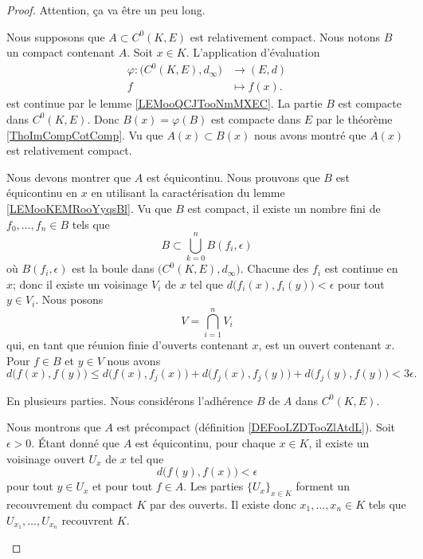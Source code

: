 \begin{proof}
	Attention, ça va être un peu long.
	\begin{subproof}
		\spitem[\( \Rightarrow\)]
		Nous supposons que \( A\subset C^0(K,E)\) est relativement compact. Nous notons \( B\) un compact contenant \( A\). Soit \( x\in K\). L'application d'évaluation
		\begin{equation}
			\begin{aligned}
				\varphi\colon \big(C^0(K,E),d_{\infty}\big) & \to (E,d)     \\
				f                                           & \mapsto f(x).
			\end{aligned}
		\end{equation}
		est continue par le lemme \ref{LEMooQCJTooNmMXEC}. La partie \( B\) est compacte dans \( C^0(K,E)\). Donc \( B(x)=\varphi(B)\) est compacte dans \( E\) par le théorème \ref{ThoImCompCotComp}. Vu que \( A(x)\subset B(x)\) nous avons montré que \( A(x)\) est relativement compact.

		Nous devons montrer que \( A\) est équicontinu. Nous prouvons que \( B\) est équicontinu en \( x\) en utilisant la caractérisation du lemme \ref{LEMooKEMRooYyqsBl}. Vu que \( B\) est compact, il existe un nombre fini de \( f_0,\ldots,f_n\in B\) tels que
		\begin{equation}
			B\subset \bigcup_{k=0}^nB(f_i,\epsilon)
		\end{equation}
		où \( B(f_i,\epsilon)\) est la boule dans \( \big( C^0(K,E),d_{\infty} \big)\). Chacune des \( f_i\) est continue en \( x\); donc il existe un voisinage \( V_i\) de \( x\) tel que \( d\big( f_i(x),f_i(y) \big)<\epsilon\) pour tout \( y\in V_i\). Nous posons
		\begin{equation}
			V=\bigcap_{i=1}^nV_i
		\end{equation}
		qui, en tant que réunion finie d'ouverts contenant \( x\), est un ouvert contenant \( x\). Pour \( f\in B\) et \( y\in V\) nous avons
		\begin{equation}
			d\big( f(x),f(y) \big)\leq d\big( f(x),f_j(x) \big)+d\big( f_j(x),f_j(y) \big)+d\big( f_j(y),f(y) \big)<3\epsilon.
		\end{equation}

		\spitem[\( \Leftarrow\)]
		En plusieurs parties. Nous considérons l'adhérence \( B\) de \( A\) dans \( C^0(K,E)\).
		\begin{subproof}
			Nous montrons que \( A\) est précompact (définition \ref{DEFooLZDTooZlAtdL}). Soit \( \epsilon>0\). Étant donné que \( A\) est équicontinu, pour chaque \( x\in K\), il existe un voisinage ouvert \( U_x\) de \( x\) tel que
			\begin{equation}
				d\big( f(y),f(x) \big)<\epsilon
			\end{equation}
			pour tout \( y\in U_x\) et pour tout \( f\in A\). Les parties \( \{ U_x \}_{x\in K}\) forment un recouvrement du compact \( K\) par des ouverts. Il existe donc \( x_1,\ldots,x_n\in K\) tels que \( U_{x_1},\ldots,U_{x_n}\) recouvrent \( K\).


\end{subproof}
\end{subproof}
\end{proof}
